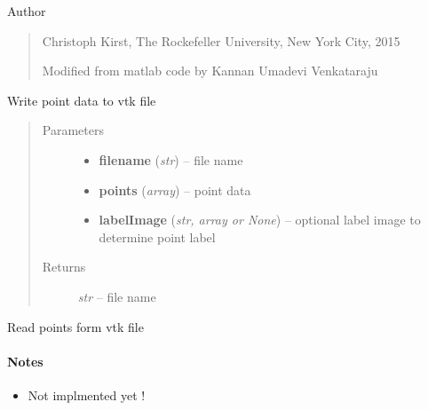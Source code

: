 \documentclass[letterpaper,10pt,english]{sphinxmanual}
\begin{document}
Author
\begin{quote}

Christoph Kirst, The Rockefeller University, New York City, 2015

Modified from matlab code by Kannan Umadevi Venkataraju
\end{quote}

\begin{fulllineitems}
\label{api/ClearMap.IO:ClearMap.IO.VTK.writePoints}
Write point data to vtk file
\begin{quote}\begin{description}
\item[{Parameters}] \leavevmode\begin{itemize}
\item {} 
\textbf{filename} (\emph{str}) --
file name

\item {} 
\textbf{points} (\emph{array}) --
point data

\item {} 
\textbf{labelImage} (\emph{str, array or None}) --
optional label image to determine point label

\end{itemize}

\item[{Returns}] \leavevmode
\emph{str} --
file name

\end{description}\end{quote}

\end{fulllineitems}


\begin{fulllineitems}
\label{api/ClearMap.IO:ClearMap.IO.VTK.readPoints}
Read points form vtk file
\paragraph{Notes}
\begin{itemize}
\item {} 
Not implmented yet !

\end{itemize}

\end{fulllineitems}
\end{document}
